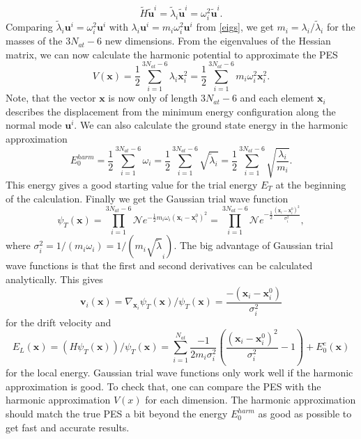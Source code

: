 \documentclass [12pt]{report}
\begin{document}
\begin{equation}
\tilde{H} \bm{\tilde{u}}^i = \tilde{\lambda}_i \bm{\tilde{u}}^i = \omega_i^2 \bm{\tilde{u}}^i.
\end{equation}
Comparing $\tilde{\lambda}_i \bm{u}^i = \omega_i^2 \bm{u}^i$ with $\lambda_i \bm{u}^i = m_i \omega_i^2 \bm{u}^i$ from \eqref{eigs}, we get $m_i = \lambda_i / \tilde{\lambda}_i$ for the masses of the $3 N_{at} - 6$ new dimensions.
From the eigenvalues of the Hessian matrix, we can now calculate the harmonic potential to approximate the PES
\begin{equation}
V(\bm{x}) = \frac{1}{2} \sum_{i=1}^{3N_{at}-6} \lambda_i \bm{x}_i^2 = \frac{1}{2} \sum_{i=1}^{3N_{at}-6} m_i \omega_i^2 \bm{x}_i^2.
\end{equation}
Note, that the vector $\bm{x}$ is now only of length $3 N_{at} - 6$ and  each element $\bm{x}_i$ describes the displacement from the minimum energy configuration along the normal mode $\bm{u}^i$.
We can also calculate the ground state energy in the harmonic approximation
\begin{equation}
E_0^{harm} = \frac{1}{2} \sum_{i=1}^{3N_{at}-6} \omega_i = \frac{1}{2}\sum_{i=1}^{3N_{at}-6}  \sqrt{\tilde{\lambda}_i} = \frac{1}{2} \sum_{i=1}^{3N_{at}-6}  \sqrt{\frac{\lambda_i}{m_i}}.
\end{equation}
This energy gives a good starting value for the trial energy $E_T$ at the beginning of the calculation. Finally we get the Gaussian trial wave function
\begin{equation}
\psi_T(\bm{x}) = \prod_{i=1}^{3N_{at}-6} \mathcal{N} e^{-\frac{1}{2} m_i \omega_i (\bm{x}_i - \bm{x}^0_i)^2} = \prod_{i=1}^{3N_{at}-6} \mathcal{N} e^{-\frac{1}{2} \frac{(\bm{x}_i - \bm{x}^0_i)^2}{\sigma_i^2}},
\end{equation}
where $\sigma_i^2 = 1/(m_i \omega_i) = 1/(m_i\sqrt{\tilde{\lambda}}_i)$. The big advantage of Gaussian trial wave functions is that the first and second derivatives can be calculated analytically. This gives
\begin{equation}
\bm{v}_i(\bm{x}) = \nabla_{\bm{x}_i} \psi_T(\bm{x})/ \psi_T(\bm{x}) = \frac{-(\bm{x}_i - \bm{x}^0_i)}{\sigma_i^2}
\end{equation}
for the drift velocity and 
\begin{equation}\label{el}
E_L(\bm{x}) = (H\psi_T(\bm{x}))/\psi_T(\bm{x}) = \sum_{i=1}^{N_{at}} \frac{-1}{2m_i \sigma^2_i} \left( \frac{(\bm{x}_i - \bm{x}^0_i)^2}{\sigma^2_i} - 1 \right) + E_0^e(\bm{x})
\end{equation}
for the local energy.
Gaussian trial wave functions only work well if the harmonic approximation is good. To check that, one can compare the PES with the harmonic approximation $V(x)$ for each dimension. The harmonic approximation should match the true PES a bit beyond the energy $E_0^{harm}$ as good as possible to get fast and accurate results.
\end{document}
